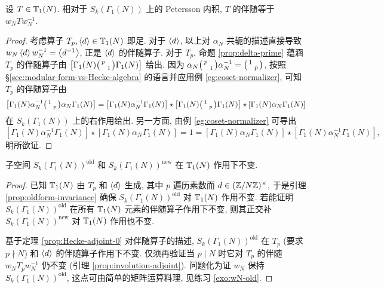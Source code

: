 \begin{lemma}\label{prop:involution-adjoint}
	设 $T \in \mathbb{T}_1(N)$. 相对于 $S_k(\Gamma_1(N))$ 上的 Petersson 内积, $T$ 的伴随等于 $w_N T w_N^{-1}$.
\end{lemma}
\begin{proof}
	考虑算子 $T_p, \left\langle d \right\rangle \in \mathbb{T}_1(N)$ 即足. 对于 $\left\langle d \right\rangle$, 以上对 $\alpha_N$ 共轭的描述直接导致 $w_N \left\langle d \right\rangle w_N^{-1} = \left\langle d^{-1} \right\rangle$, 正是 $\left\langle d \right\rangle$ 的伴随算子. 对于 $T_p$, 命题 \ref{prop:delta-prime} 蕴涵 $T_p$ 的伴随算子由 $\left[ \Gamma_1(N)\bigl(\begin{smallmatrix} p &  \\  & 1 \end{smallmatrix}\bigr) \Gamma_1(N)\right]$ 给出. 因为 $\alpha_N \bigl(\begin{smallmatrix} p &  \\  & 1 \end{smallmatrix}\bigr) \alpha_N^{-1} = \bigl(\begin{smallmatrix} 1 &  \\  & p \end{smallmatrix}\bigr)$, 按照 \S\ref{sec:modular-form-vs-Hecke-algebra} 的语言并应用例 \ref{eg:coset-normalizer}, 可知 $T_p$ 的伴随算子由
	\[ \left[ \Gamma_1(N) \alpha_N^{-1} \bigl(\begin{smallmatrix} 1 &  \\  & p \end{smallmatrix}\bigr) \alpha_N \Gamma_1(N) \right] = \left[\Gamma_1(N)\alpha_N^{-1} \Gamma_1(N)\right] \star \left[ \Gamma_1(N) \bigl(\begin{smallmatrix} 1 &  \\  & p \end{smallmatrix}\bigr) \Gamma_1(N) \right] \star \left[ \Gamma_1(N) \alpha_N \Gamma_1(N) \right] \]
	在 $S_k(\Gamma_1(N))$ 上的右作用给出. 另一方面, 由例 \ref{eg:coset-normalizer} 可导出
	\[ \left[\Gamma_1(N) \alpha_N^{-1} \Gamma_1(N)\right] \star \left[ \Gamma_1(N) \alpha_N \Gamma_1(N)\right] = 1 = \left[ \Gamma_1(N) \alpha_N \Gamma_1(N)\right] \star \left[\Gamma_1(N) \alpha_N^{-1} \Gamma_1(N)\right], \]
	明所欲证. 
\end{proof}

\begin{proposition}\label{prop:newform-invariance}
	子空间 $S_k(\Gamma_1(N))^{\mathrm{old}}$ 和 $S_k(\Gamma_1(N))^{\mathrm{new}}$ 在 $\mathbb{T}_1(N)$ 作用下不变.
\end{proposition}
\begin{proof}
	已知 $\mathbb{T}_1(N)$ 由 $T_p$ 和 $\left\langle d \right\rangle$ 生成, 其中 $p$ 遍历素数而 $d \in (\mathbb{Z}/N\mathbb{Z})^\times$, 于是引理 \ref{prop:oldform-invariance} 确保 $S_k(\Gamma_1(N))^\text{old}$ 对 $\mathbb{T}_1(N)$ 作用不变. 若能证明 $S_k(\Gamma_1(N))^\text{old}$ 在所有 $\mathbb{T}_1(N)$ 元素的伴随算子作用下不变, 则其正交补 $S_k(\Gamma_1(N))^\text{new}$ 对 $\mathbb{T}_1(N)$ 作用也不变.
	
	基于定理 \ref{prop:Hecke-adjoint-0} 对伴随算子的描述, $S_k(\Gamma_1(N))^\text{old}$ 在 $T_p$ (要求 $p \nmid N$) 和 $\left\langle d \right\rangle$ 的伴随算子作用下不变. 仅须再验证当 $p \mid N$ 时它对 $T_p$ 的伴随 $w_N T_p w_N^{-1}$ 仍不变 (引理 \ref{prop:involution-adjoint}). 问题化为证 $w_N$ 保持 $S_k(\Gamma_1(N))^{\text{old}}$, 这点可由简单的矩阵运算料理, 见练习 \ref{exo:wN-old}.
\end{proof}

